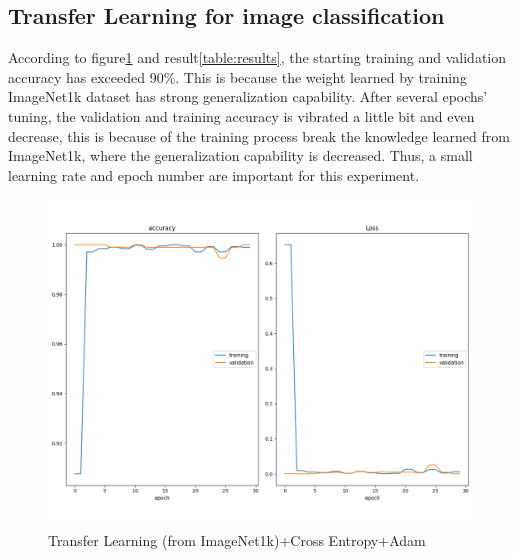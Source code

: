 \documentclass[10pt,twocolumn,letterpaper]{article}
\begin{document}
\subsection{Transfer Learning for image classification }
According to figure\ref{Transfer} and result\ref{table:results}, the starting training and validation accuracy has exceeded 90$\%$. This is because the weight learned by training ImageNet1k dataset has strong generalization capability. After several epochs' tuning, the validation and training accuracy is vibrated a little bit and even decrease, this is because of the training process break the knowledge learned from ImageNet1k, where the generalization capability is decreased. Thus, a small learning rate and epoch number are important for this experiment.
\begin{figure}[t!]
    \centering
    \includegraphics[scale= 0.3]{ProgressReport/Transfer_Learning.pdf}
    \caption{Transfer Learning (from ImageNet1k)+Cross Entropy+Adam}
    \label{Transfer}
\end{figure}
\end{document}
